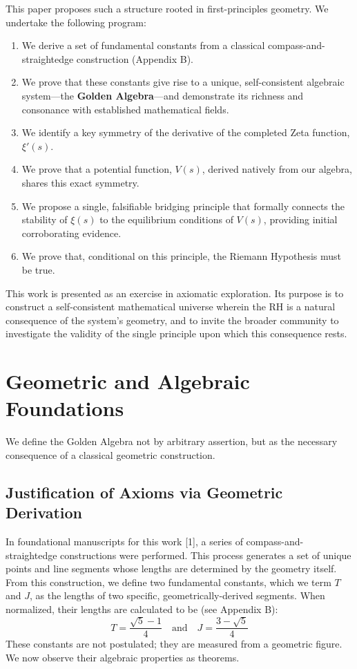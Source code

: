 \documentclass{article}
\theoremstyle{plain}
\theoremstyle{definition}
\theoremstyle{remark}
\begin{document}
This paper proposes such a structure rooted in first-principles geometry. We undertake the following program:
\begin{enumerate}
    \item We derive a set of fundamental constants from a classical compass-and-straightedge construction (Appendix B).
    \item We prove that these constants give rise to a unique, self-consistent algebraic system—the \textbf{Golden Algebra}—and demonstrate its richness and consonance with established mathematical fields.
    \item We identify a key symmetry of the derivative of the completed Zeta function, $\xi'(s)$.
    \item We prove that a potential function, $V(s)$, derived natively from our algebra, shares this exact symmetry.
    \item We propose a single, falsifiable bridging principle that formally connects the stability of $\xi(s)$ to the equilibrium conditions of $V(s)$, providing initial corroborating evidence.
    \item We prove that, conditional on this principle, the Riemann Hypothesis must be true.
\end{enumerate}
This work is presented as an exercise in axiomatic exploration. Its purpose is to construct a self-consistent mathematical universe wherein the RH is a natural consequence of the system's geometry, and to invite the broader community to investigate the validity of the single principle upon which this consequence rests.

\section{Geometric and Algebraic Foundations}
We define the Golden Algebra not by arbitrary assertion, but as the necessary consequence of a classical geometric construction.

\subsection{Justification of Axioms via Geometric Derivation}
In foundational manuscripts for this work [1], a series of compass-and-straightedge constructions were performed. This process generates a set of unique points and line segments whose lengths are determined by the geometry itself. From this construction, we define two fundamental constants, which we term $T$ and $J$, as the lengths of two specific, geometrically-derived segments. When normalized, their lengths are calculated to be (see Appendix B):
$$ T = \frac{\sqrt{5}-1}{4} \quad \text{and} \quad J = \frac{3-\sqrt{5}}{4} $$
These constants are not postulated; they are measured from a geometric figure. We now observe their algebraic properties as theorems.
\end{document}
